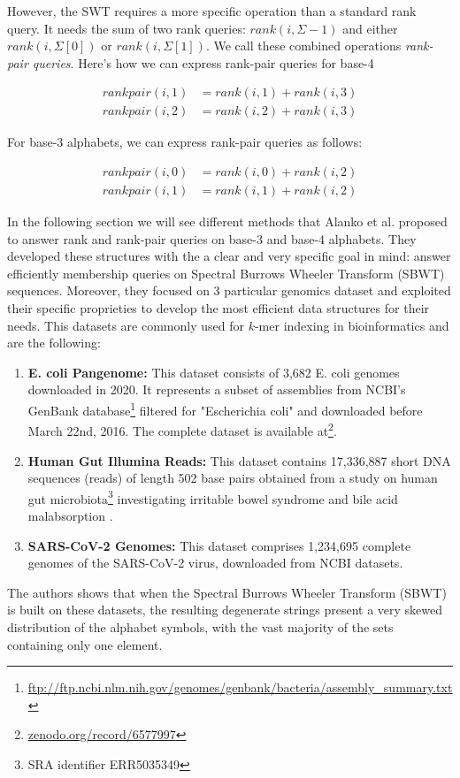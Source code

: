 \noindent However, the SWT requires a more specific operation than a standard rank query. It needs the sum of two rank queries: $rank(i, \Sigma - 1)$ and either $rank(i, \Sigma[0])$ or $rank(i, \Sigma[1])$. We call these combined operations \emph{rank-pair queries}. Here's how we can express rank-pair queries for base-4

\begin{align}
    rankpair(i,1) & = rank(i,1) + rank(i,3) \\
    rankpair(i,2) & = rank(i,2) + rank(i,3)
\end{align}

\noindent For base-3 alphabets, we can express rank-pair queries as follows:

\begin{align}
    rankpair(i,0) & = rank(i,0) + rank(i,2) \\
    rankpair(i,1) & = rank(i,1) + rank(i,2)
\end{align}

\noindent In the following section we will see different methods that Alanko et al. \cite{SubsetWT} proposed to answer rank and rank-pair queries on base-3 and base-4 alphabets. They developed these structures with the a clear and very specific goal in mind: answer efficiently membership queries on Spectral Burrows Wheeler Transform (SBWT) sequences. Moreover, they focused on 3 particular genomics dataset and exploited their specific proprieties to develop the most efficient data structures for their needs. This datasets are commonly used for $k$-mer indexing in bioinformatics and are the following:

\begin{enumerate} \label{datasets}
    \item \textbf{E. coli Pangenome:} This dataset consists of 3,682 E. coli genomes downloaded in 2020. It represents a subset of assemblies from NCBI's GenBank database\footnote{\url{ftp://ftp.ncbi.nlm.nih.gov/genomes/genbank/bacteria/assembly\_summary.txt}} filtered for "Escherichia coli" and downloaded before March 22nd, 2016. The complete dataset is available at\footnote{\url{zenodo.org/record/6577997}}.
    \item \textbf{Human Gut Illumina Reads:} This dataset contains 17,336,887 short DNA sequences (reads) of length 502 base pairs obtained from a study on human gut microbiota\footnote{SRA identifier ERR5035349} investigating irritable bowel syndrome and bile acid malabsorption \cite{jeffery2020differences}.
    \item \textbf{SARS-CoV-2 Genomes:} This dataset comprises 1,234,695 complete genomes of the SARS-CoV-2 virus, downloaded from NCBI datasets.
\end{enumerate}

\noindent The authors shows that when the Spectral Burrows Wheeler Transform (SBWT) is built on these datasets, the resulting degenerate strings present a very skewed distribution of the alphabet symbols, with the vast majority of the sets containing only one element.
